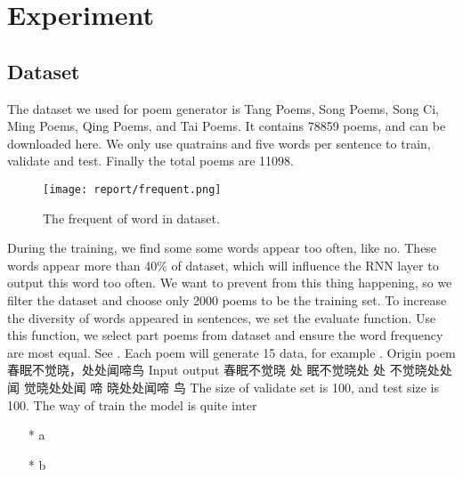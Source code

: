 \documentclass[10pt,twocolumn,letterpaper]{article}
\begin{document}
\section{Experiment}



\subsection{Dataset}
The dataset we used for poem generator is Tang Poems, Song Poems, Song Ci, Ming Poems, Qing Poems, and Tai Poems. It contains 78859 poems, and can be downloaded here. We only use quatrains and five words per sentence to train, validate and test. Finally the total poems are 11098.

\begin{figure}[t]
\begin{center}
   \texttt{[image: report/frequent.png]}
\end{center}
   \caption{The frequent of word in dataset.}
\label{fig:frequent}
\end{figure}

During the training, we find some some words appear too often, like no. These words appear more than 40\% of dataset, which will influence the RNN layer to output this word too often. We want to prevent from this thing happening, so we filter the dataset and choose only 2000 poems to be the training set. To increase the diversity of words appeared in sentences, we set the evaluate function.
Use this function, we select part poems from dataset and ensure the word frequency are most equal. See . Each poem will generate 15 data, for example .
Origin poem 春眠不觉晓，处处闻啼鸟
Input   output
春眠不觉晓 处
眠不觉晓处 处
不觉晓处处 闻
觉晓处处闻 啼
晓处处闻啼 鸟
The size of validate set is 100, and test size is 100. 
The way of train the model is quite inter


\begin{itemize}
\item[*] a
\item[*] b
\end{itemize}
\end{document}
